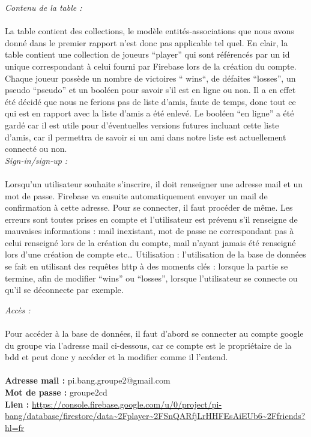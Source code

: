 \documentclass[a4paper,11pt]{article}
\begin{document}
\textit{Contenu de la table :} \\\\
	La table contient des collections, le modèle entités-associations que nous avons donné dans le premier rapport n’est donc pas applicable tel quel. En clair, la table contient une collection de joueurs “player” qui sont référencés par un id unique correspondant à celui fourni par Firebase lors de la création du compte. 
    Chaque joueur possède un nombre de victoires “ wins“, de défaites “losses”, un pseudo “pseudo” et un booléen pour savoir s’il est en ligne ou non. Il a en effet été décidé que nous ne ferions pas de liste d’amis, faute de temps, donc tout ce qui est en rapport avec la liste d’amis a été enlevé. 
    Le booléen “en ligne” a été gardé car il est utile pour d’éventuelles versions futures incluant cette liste d’amis, car il permettra de savoir si un ami dans notre liste est actuellement connecté ou non. \\

\textit{Sign-in/sign-up :} \\\\ 
    Lorsqu’un utilisateur souhaite s’inscrire, il doit renseigner une adresse mail et un mot de passe. Firebase va ensuite automatiquement envoyer un mail de confirmation à cette adresse. Pour se connecter, il faut procéder de même. 
    Les erreurs sont toutes prises en compte et l’utilisateur est prévenu s’il renseigne de mauvaises informations : mail inexistant, mot de passe ne correspondant pas à celui renseigné lors de la création du compte, mail n’ayant jamais été renseigné lors d’une création de compte etc…
    Utilisation : l’utilisation de la base de données se fait en utilisant des requêtes http à des moments clés : lorsque la partie se termine, afin de modifier “wins” ou “losses”, lorsque l’utilisateur se connecte ou qu’il se déconnecte par exemple. \\

\newpage

\textit{Accès :} \\\\
    Pour accéder à la base de données, il faut d’abord se connecter au compte google du groupe via l’adresse mail ci-dessous, car ce compte est le propriétaire de la bdd et peut donc y accéder et la modifier comme il l’entend.\\
\\
\textbf{Adresse mail :} pi.bang.groupe2@gmail.com \hfill  \\
\textbf{Mot de passe :} groupe2cd  \\
\textbf{Lien :} \url {https://console.firebase.google.com/u/0/project/pi-bang/database/firestore/data~2Fplayer~2FSnQARfjLrHHFEsAiEUb6~2Ffriends?hl=fr}  \\\\
\end{document}

